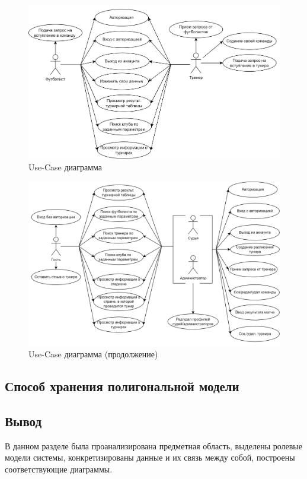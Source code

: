 \begin{figure}[h]
	\centering
	\includegraphics[height=0.3\textheight]{img/ppo-Use-Case1.png}
	\caption{Use-Case диаграмма}
	\label{img:Use-case1}
\end{figure}

\begin{figure}[h]
	\centering
	\includegraphics[height=0.3\textheight]{img/ppo-Use-Case2.png}
	\caption{Use-Case диаграмма (продолжение)}
	\label{img:Use-case2}
\end{figure}
\newpage

\subsection{Способ хранения полигональной модели}



\subsection*{Вывод}
В данном разделе была проанализирована предметная область, выделены ролевые модели системы, конкретизированы данные и их связь между собой, построены соответствующие диаграммы.